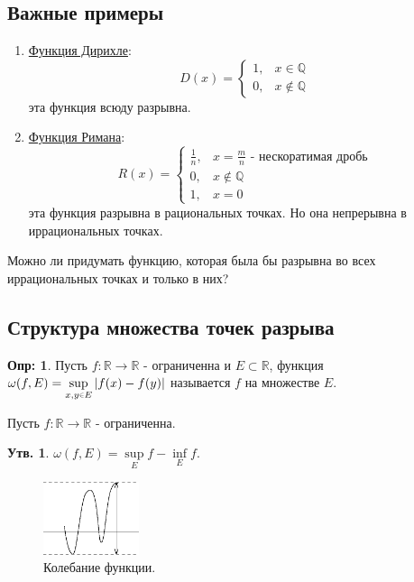 \documentclass[12pt]{article}
\theoremstyle{definition}
\newtheorem{defn}{Опр:}
\newtheorem{prop}{Утв.}
\newcommand{\smallerrel}[1]{\mathrel{\mathpalette\smallerrelaux{#1}}}
\newcommand{\smallerrelaux}[2]{\raisebox{.1ex}{\scalebox{.75}{$#1#2$}}}
\newcommand{\smallin}{\smallerrel{\in}}
\begin{document}
\subsection*{Важные примеры}
\begin{enumerate}[label={\arabic*)}]
	\item \uline{Функция Дирихле}:
	$$ D(x) = \begin{cases} 
		1, & x \in \mathbb{Q} \\
		0, & x \notin \mathbb{Q} 
	\end{cases}$$
	эта функция всюду разрывна.
	\item \uline{Функция Римана}: 
		$$ R(x) = \begin{cases} 
		\frac{1}{n}, & x= \frac{m}{n} \text{ - нескоратимая дробь}\\
		0, & x \notin \mathbb{Q}\\
		1, & x = 0 
	\end{cases}$$
	эта функция разрывна в рациональных точках. Но она непрерывна в иррациональных точках.
\end{enumerate}

Можно ли придумать функцию, которая была бы разрывна во всех иррациональных точках и только в них?

\subsection*{Структура множества точек разрыва}

\begin{defn}
	Пусть $f \colon \mathbb{R} \to \mathbb{R}$ - ограниченна и $E \subset \mathbb{R}$, функция $\omega(f,E) = \sup\limits_{x,y \smallin E}|f(x) - f(y)|$ называется  $f$ на множестве $E$.
\end{defn}

Пусть $f \colon \mathbb{R} \to \mathbb{R}$ - ограниченна.

\begin{prop}
	$\omega(f,E) = \sup\limits_{E}{f} - \inf\limits_{E}{f}$.
\end{prop}
\begin{figure}[H]
	\centering
	\includegraphics[width=0.25\textwidth]{17_8.eps}
	\caption{Колебание функции.}
	\label{17_8}
\end{figure}
\end{document}
